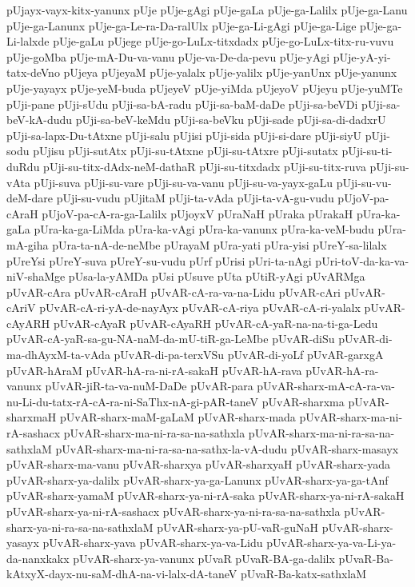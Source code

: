 {pUjayx-vayx-kitx-yanunx
pUje
pUje-gAgi
pUje-gaLa
pUje-ga-Lalilx
pUje-ga-Lanu
pUje-ga-Lanunx
pUje-ga-Le-ra-Da-ralUlx
pUje-ga-Li-gAgi
pUje-ga-Lige
pUje-ga-Li-lalxde
pUje-gaLu
pUjege
pUje-go-LuLx-titxdadx
pUje-go-LuLx-titx-ru-vuvu
pUje-goMba
pUje-mA-Du-va-vanu
pUje-va-De-da-pevu
pUje-yAgi
pUje-yA-yi-tatx-deVno
pUjeya
pUjeyaM
pUje-yalalx
pUje-yalilx
pUje-yanUnx
pUje-yanunx
pUje-yayayx
pUje-yeM-buda
pUjeyeV
pUje-yiMda
pUjeyoV
pUjeyu
pUje-yuMTe
pUji-pane
pUji-sUdu
pUji-sa-bA-radu
pUji-sa-baM-daDe
pUji-sa-beVDi
pUji-sa-beV-kA-dudu
pUji-sa-beV-keMdu
pUji-sa-beVku
pUji-sade
pUji-sa-di-dadxrU
pUji-sa-lapx-Du-tAtxne
pUji-salu
pUjisi
pUji-sida
pUji-si-dare
pUji-siyU
pUji-sodu
pUjisu
pUji-sutAtx
pUji-su-tAtxne
pUji-su-tAtxre
pUji-sutatx
pUji-su-ti-duRdu
pUji-su-titx-dAdx-neM-dathaR
pUji-su-titxdadx
pUji-su-titx-ruva
pUji-su-vAta
pUji-suva
pUji-su-vare
pUji-su-va-vanu
pUji-su-va-yayx-gaLu
pUji-su-vu-deM-dare
pUji-su-vudu
pUjitaM
pUji-ta-vAda
pUji-ta-vA-gu-vudu
pUjoV-pa-cAraH
pUjoV-pa-cA-ra-ga-Lalilx
pUjoyxV
pUraNaH
pUraka
pUrakaH
pUra-ka-gaLa
pUra-ka-ga-LiMda
pUra-ka-vAgi
pUra-ka-vanunx
pUra-ka-veM-budu
pUra-mA-giha
pUra-ta-nA-de-neMbe
pUrayaM
pUra-yati
pUra-yisi
pUreY-sa-lilalx
pUreYsi
pUreY-suva
pUreY-su-vudu
pUrf
pUrisi
pUri-ta-nAgi
pUri-toV-da-ka-va-niV-shaMge
pUsa-la-yAMDa
pUsi
pUsuve
pUta
pUtiR-yAgi
pUvARMga
pUvAR-cAra
pUvAR-cAraH
pUvAR-cA-ra-va-na-Lidu
pUvAR-cAri
pUvAR-cAriV
pUvAR-cA-ri-yA-de-nayAyx
pUvAR-cA-riya
pUvAR-cA-ri-yalalx
pUvAR-cAyARH
pUvAR-cAyaR
pUvAR-cAyaRH
pUvAR-cA-yaR-na-na-ti-ga-Ledu
pUvAR-cA-yaR-sa-gu-NA-naM-da-mU-tiR-ga-LeMbe
pUvAR-diSu
pUvAR-di-ma-dhAyxM-ta-vAda
pUvAR-di-pa-terxVSu
pUvAR-di-yoLf
pUvAR-garxgA
pUvAR-hAraM
pUvAR-hA-ra-ni-rA-sakaH
pUvAR-hA-rava
pUvAR-hA-ra-vanunx
pUvAR-jiR-ta-va-nuM-DaDe
pUvAR-para
pUvAR-sharx-mA-cA-ra-va-nu-Li-du-tatx-rA-cA-ra-ni-SaThx-nA-gi-pAR-taneV
pUvAR-sharxma
pUvAR-sharxmaH
pUvAR-sharx-maM-gaLaM
pUvAR-sharx-mada
pUvAR-sharx-ma-ni-rA-sashacx
pUvAR-sharx-ma-ni-ra-sa-na-sathxla
pUvAR-sharx-ma-ni-ra-sa-na-sathxlaM
pUvAR-sharx-ma-ni-ra-sa-na-sathx-la-vA-dudu
pUvAR-sharx-masayx
pUvAR-sharx-ma-vanu
pUvAR-sharxya
pUvAR-sharxyaH
pUvAR-sharx-yada
pUvAR-sharx-ya-dalilx
pUvAR-sharx-ya-ga-Lanunx
pUvAR-sharx-ya-ga-tAnf
pUvAR-sharx-yamaM
pUvAR-sharx-ya-ni-rA-saka
pUvAR-sharx-ya-ni-rA-sakaH
pUvAR-sharx-ya-ni-rA-sashacx
pUvAR-sharx-ya-ni-ra-sa-na-sathxla
pUvAR-sharx-ya-ni-ra-sa-na-sathxlaM
pUvAR-sharx-ya-pU-vaR-guNaH
pUvAR-sharx-yasayx
pUvAR-sharx-yava
pUvAR-sharx-ya-va-Lidu
pUvAR-sharx-ya-va-Li-ya-da-nanxkakx
pUvAR-sharx-ya-vanunx
pUvaR
pUvaR-BA-ga-dalilx
pUvaR-Ba-kAtxyX-dayx-nu-saM-dhA-na-vi-lalx-dA-taneV
pUvaR-Ba-katx-sathxlaM
}
